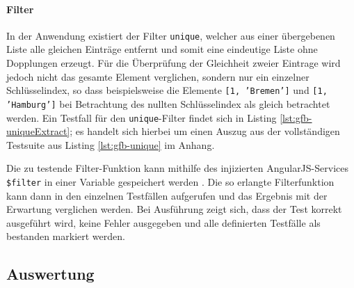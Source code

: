 \paragraph{Filter}
In der Anwendung existiert der Filter \texttt{unique}, welcher aus einer übergebenen Liste alle gleichen Einträge entfernt und somit eine eindeutige Liste ohne Dopplungen erzeugt. Für die Überprüfung der Gleichheit zweier Eintrage wird jedoch nicht das gesamte Element verglichen, sondern nur ein einzelner Schlüsselindex, so dass beispielsweise die Elemente \texttt{[1, 'Bremen']} und \texttt{[1, 'Hamburg']} bei Betrachtung des nullten Schlüsselindex als gleich betrachtet werden. Ein Testfall für den \texttt{unique}-Filter findet sich in Listing \ref{lst:gfb-uniqueExtract}; es handelt sich hierbei um einen Auszug aus der vollständigen Testsuite aus Listing \ref{lst:gfb-unique} im Anhang.

\begin{figure}[H]
	
\end{figure}

Die zu testende Filter-Funktion kann mithilfe des injizierten AngularJS-Services \texttt{\$filter} in einer Variable gespeichert werden \cite{angular-filter}. Die so erlangte Filterfunktion kann dann in den einzelnen Testfällen aufgerufen und das Ergebnis mit der Erwartung verglichen werden. Bei Ausführung zeigt sich, dass der Test korrekt ausgeführt wird, keine Fehler ausgegeben und alle definierten Testfälle als bestanden markiert werden.
\subsection{Auswertung}